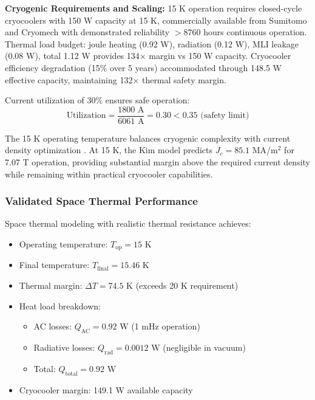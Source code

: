 \documentclass[10pt,twocolumn]{article}
\begin{document}
\textbf{Cryogenic Requirements and Scaling:} 15 K operation requires closed-cycle cryocoolers with 150 W capacity at 15 K, commercially available from Sumitomo and Cryomech with demonstrated reliability $>8760$ hours continuous operation. Thermal load budget: joule heating (0.92 W), radiation (0.12 W), MLI leakage (0.08 W), total 1.12 W provides 134× margin vs 150 W capacity. Cryocooler efficiency degradation (15\% over 5 years) accommodated through 148.5 W effective capacity, maintaining 132× thermal safety margin.

Current utilization of 30\% ensures safe operation:
\begin{equation}
\text{Utilization} = \frac{1800 \text{ A}}{6061 \text{ A}} = 0.30 < 0.35 \text{ (safety limit)}
\end{equation}

The 15 K operating temperature balances cryogenic complexity with current density optimization \cite{superpower2022}. At 15 K, the Kim model predicts $J_c = 85.1$ MA/m$^2$ for 7.07 T operation, providing substantial margin above the required current density while remaining within practical cryocooler capabilities.

\subsubsection{Validated Space Thermal Performance}

Space thermal modeling with realistic thermal resistance achieves:

\begin{itemize}
\item Operating temperature: $T_{\text{op}} = 15$ K
\item Final temperature: $T_{\text{final}} = 15.46$ K
\item Thermal margin: $\Delta T = 74.5$ K (exceeds 20 K requirement)
\item Heat load breakdown:
  \begin{itemize}
  \item AC losses: $Q_{\text{AC}} = 0.92$ W (1 mHz operation)
  \item Radiative losses: $Q_{\text{rad}} = 0.0012$ W (negligible in vacuum)
  \item Total: $Q_{\text{total}} = 0.92$ W
  \end{itemize}
\item Cryocooler margin: 149.1 W available capacity
\end{itemize}
\end{document}
